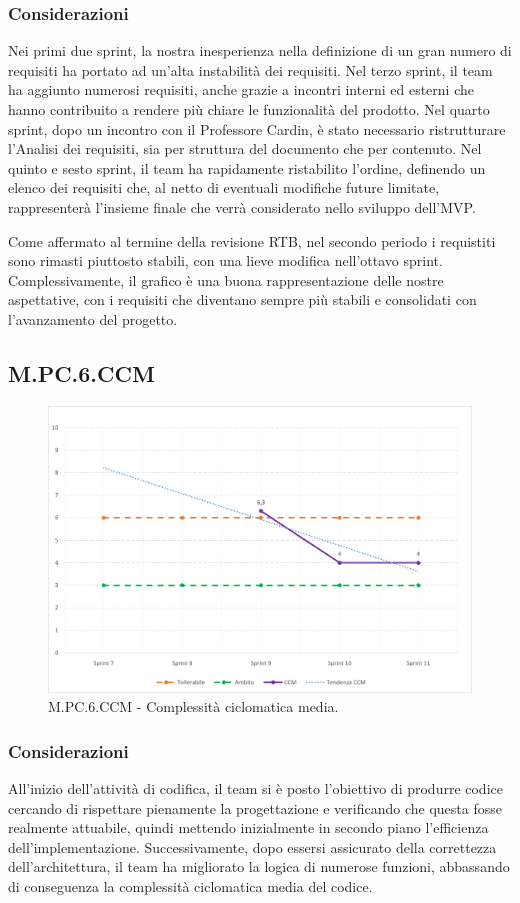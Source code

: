 \documentclass[10pt, a4paper]{article}
\begin{document}
\subsubsection{Considerazioni}
Nei primi due sprint, la nostra inesperienza nella definizione di un gran numero di requisiti ha portato ad un'alta instabilità dei requisiti.
Nel terzo sprint, il team ha aggiunto numerosi requisiti, anche grazie a incontri interni ed esterni che hanno contribuito a rendere più chiare le funzionalità del prodotto.
Nel quarto sprint, dopo un incontro con il Professore Cardin, è stato necessario ristrutturare l'Analisi dei requisiti, sia per struttura del documento che per contenuto.
Nel quinto e sesto sprint, il team ha rapidamente ristabilito l'ordine, definendo un elenco dei requisiti che, al netto di eventuali modifiche future limitate, rappresenterà l'insieme finale che verrà considerato nello sviluppo dell'MVP.

Come affermato al termine della revisione RTB, nel secondo periodo i requistiti sono rimasti piuttosto stabili, con una lieve modifica nell'ottavo sprint. Complessivamente, il grafico è una buona rappresentazione delle nostre aspettative, con i requisiti che diventano sempre più stabili e consolidati con l'avanzamento del progetto.

\subsection{M.PC.6.CCM}
\begin{figure}[H]
\includegraphics[width=15.5cm]{img/metriche/MPC6CCM.png}
\caption{M.PC.6.CCM - Complessità ciclomatica media.}
\end{figure}
\subsubsection{Considerazioni}
All'inizio dell'attività di codifica, il team si è posto l'obiettivo di produrre codice cercando di rispettare pienamente la progettazione e verificando che questa fosse realmente attuabile, quindi mettendo inizialmente in secondo piano l'efficienza dell'implementazione. Successivamente, dopo essersi assicurato della correttezza dell'architettura, il team ha migliorato la logica di numerose funzioni, abbassando di conseguenza la complessità ciclomatica media del codice.
\end{document}
